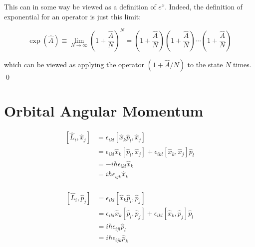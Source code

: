 \documentclass[12pt]{article}
\begin{document}
This can in some way be viewed as a definition of $e^{x}$. Indeed, the definition of exponential for an operator is just this limit:

\begin{equation}
    \exp(\hat{A}) \equiv \lim_{N \to \infty} \left( 1 + \frac{\hat{A}}{N} \right)^{N} = \left( 1 + \frac{\hat{A}}{N} \right) \left( 1 + \frac{\hat{A}}{N} \right) \cdots \left( 1 + \frac{\hat{A}}{N} \right)
\end{equation}

which can be viewed as applying the operator $(1 + \hat{A}/N)$ to the state $N$ times.
\qed






\pagebreak
\section*{Orbital Angular Momentum}




\begin{equation}
\begin{split}
    [\hat{L}_{i}, \hat{x}_{j}] &= \epsilon_{ikl} [\hat{x}_{k} \hat{p}_{l}, \hat{x}_{j}] \\
    &= \epsilon_{ikl} \hat{x}_{k} [\hat{p}_{l}, \hat{x}_{j}] + \epsilon_{ikl} [\hat{x}_{k}, \hat{x}_{j}] \hat{p}_{l} \\
    &= -i\hbar \epsilon_{ikl} \hat{x}_{k} \\
    &= i\hbar \epsilon_{ijk} \hat{x}_{k} \\
\end{split}
\end{equation}

\begin{equation}
\begin{split}
    [\hat{L}_{i}, \hat{p}_{j}] &= \epsilon_{ikl} [\hat{x}_{k} \hat{p}_{l}, \hat{p}_{j}] \\
    &= \epsilon_{ikl} \hat{x}_{k} [\hat{p}_{l}, \hat{p}_{j}] + \epsilon_{ikl} [\hat{x}_{k}, \hat{p}_{j}] \hat{p}_{l} \\
    &= i\hbar \epsilon_{ijl} \hat{p}_{l} \\
    &= i\hbar \epsilon_{ijk} \hat{p}_{k} \\
\end{split}
\end{equation}
\end{document}
